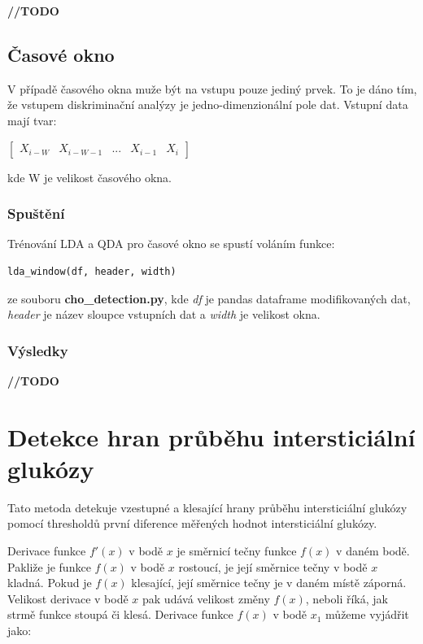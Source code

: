 \textbf{//TODO}

\subsection{Časové okno}

V případě časového okna muže být na vstupu pouze jediný prvek. To je dáno tím, že vstupem diskriminační analýzy je jedno-dimenzionální pole dat. Vstupní data mají tvar:

$\begin{bmatrix}
X_{i-W} & X_{i-W-1} & ... & X_{i-1} & X_{i}
\end{bmatrix}$

\noindent kde W je velikost časového okna.

\subsubsection{Spuštění}

Trénování LDA a QDA pro časové okno se spustí voláním funkce:
\begin{verbatim}
lda_window(df, header, width)
\end{verbatim}
ze souboru \textbf{cho\_detection.py}, kde \textit{df} je pandas dataframe modifikovaných dat, \textit{header} je název sloupce vstupních dat a \textit{width} je velikost okna.

\subsubsection{Výsledky}

\textbf{//TODO}


\section{Detekce hran průběhu intersticiální glukózy}
\label{ch:threshold}

Tato metoda detekuje vzestupné a klesající hrany průběhu intersticiální glukózy pomocí thresholdů první diference měřených hodnot intersticiální glukózy.

Derivace funkce $f'(x)$ v bodě $x$ je směrnicí tečny funkce $f(x)$ v daném bodě. Pakliže je funkce $f(x)$ v bodě $x$ rostoucí, je její směrnice tečny v bodě $x$ kladná. Pokud je $f(x)$ klesající, její směrnice tečny je v daném místě záporná. Velikost derivace v bodě $x$ pak udává velikost změny $f(x)$, neboli říká, jak strmě funkce stoupá či klesá. Derivace funkce $f(x)$ v bodě $x_{1}$ můžeme vyjádřit jako:

